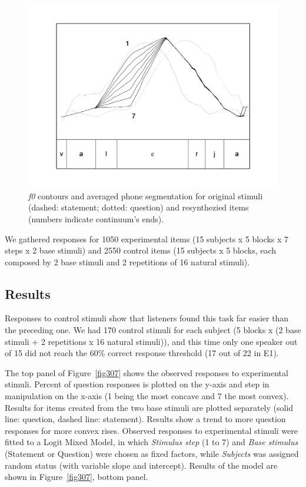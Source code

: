 \begin{figure}[t]
\centering
\includegraphics[height=.4\textheight]{images/306.png}
\caption{\textit{f0} contours and averaged phone segmentation for original stimuli (dashed: statement; dotted: question) and resynthezied items (numbers indicate continuum's ends).}
\label{fig306}\end{figure}

We gathered responses for 1050 experimental items (15 subjects x 5 blocks x 7 steps x 2 base stimuli) and 2550 control items (15 subjects x 5 blocks, each composed by 2 base stimuli and 2 repetitions of 16 natural stimuli).

\subsection{Results}\label{sec332}
Responses to control stimuli show that listeners found this task far easier than the preceding one. We had 170 control stimuli for each subject (5 blocks x (2 base stimuli + 2 repetitions x 16 natural stimuli)), and this time only one speaker out of 15 did not reach the 60\% correct response threshold (17 out of 22 in E1). 

The top panel of Figure~\ref{fig307} shows the observed responses to experimental stimuli. Percent of question responses is plotted on the y-axis and step in manipulation on the x-axis (1 being the most concave and 7 the most convex). Results for items created from the two base stimuli are plotted separately (solid line: question, dashed line: statement). Results show a trend to more question responses for more convex rises. Observed responses to experimental stimuli were fitted to a Logit Mixed Model, in which \textit{Stimulus step} (1 to 7) and \textit{Base stimulus} (Statement or Question) were chosen as fixed factors, while \textit{Subjects} was assigned random status (with variable slope and intercept). Results of the model are shown in Figure~\ref{fig307}, bottom panel.

